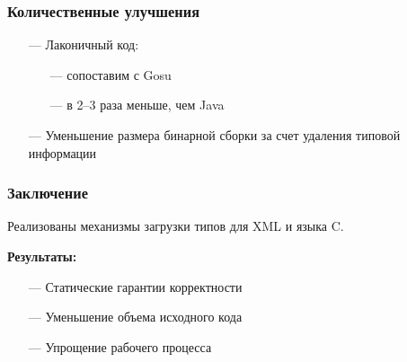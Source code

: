 \documentclass[14pt]{beamer}
\begin{document}
\begin{frame}\frametitle{Количественные улучшения}
    \begin{itemize}
        \item[---] Лаконичный код:
            \begin{itemize}
                \item[---] сопоставим с Gosu
                \item[---] в 2--3 раза меньше, чем Java
            \end{itemize}
        \item[---] Уменьшение размера бинарной сборки за счет удаления типовой информации
    \end{itemize}
\end{frame}

\begin{frame}\frametitle{Заключение}
Реализованы механизмы загрузки типов для XML и языка C.

\textbf{Результаты:}
    \begin{itemize}
        \item[---] Статические гарантии корректности
        \item[---] Уменьшение объема исходного кода
        \item[---] Упрощение рабочего процесса
    \end{itemize}
\end{frame}
\end{document}
